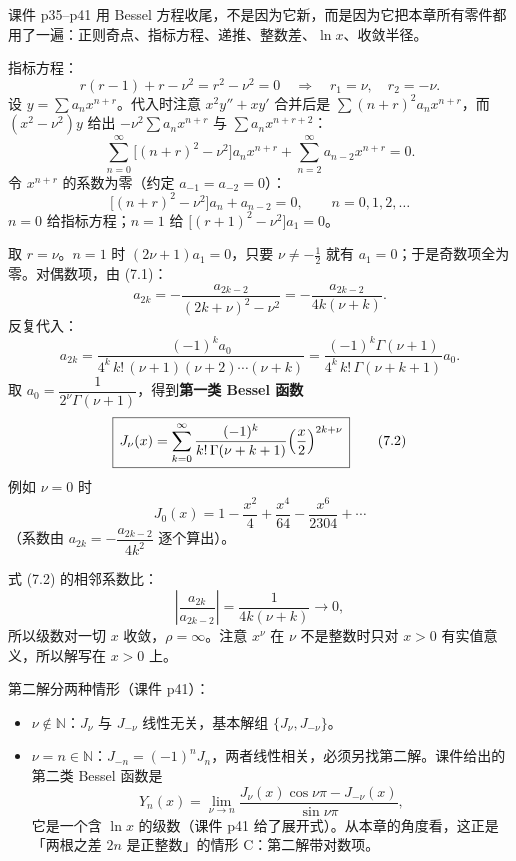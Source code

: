 \documentclass[11pt]{ctexart}
\newcommand{\N}{\mathbb{N}}
\begin{document}
课件 p35--p41 用 Bessel 方程收尾，不是因为它新，而是因为它把本章所有零件都用了一遍：正则奇点、指标方程、递推、整数差、$\ln x$、收敛半径。




指标方程：
\[
r(r-1)+r-\nu^2=r^2-\nu^2=0
\quad\Longrightarrow\quad
r_1=\nu,\quad r_2=-\nu .
\]
设 $y=\sum a_nx^{n+r}$。代入时注意 $x^2y''+xy'$ 合并后是 $\sum(n+r)^2a_nx^{n+r}$，而 $(x^2-\nu^2)y$ 给出 $-\nu^2\sum a_nx^{n+r}$ 与 $\sum a_nx^{n+r+2}$：
\[
\sum_{n=0}^{\infty}\bigl[(n+r)^2-\nu^2\bigr]a_nx^{n+r}+\sum_{n=2}^{\infty}a_{n-2}x^{n+r}=0 .
\]
令 $x^{n+r}$ 的系数为零（约定 $a_{-1}=a_{-2}=0$）：
\[
\bigl[(n+r)^2-\nu^2\bigr]a_n+a_{n-2}=0,\qquad n=0,1,2,\dots \tag{7.1}
\]
$n=0$ 给指标方程；$n=1$ 给 $\bigl[(r+1)^2-\nu^2\bigr]a_1=0$。

取 $r=\nu$。$n=1$ 时 $(2\nu+1)a_1=0$，只要 $\nu\neq-\frac12$ 就有 $a_1=0$；于是奇数项全为零。对偶数项，由 (7.1)：
\[
a_{2k}=-\frac{a_{2k-2}}{(2k+\nu)^2-\nu^2}
=-\frac{a_{2k-2}}{4k(\nu+k)} .
\]
反复代入：
\[
a_{2k}=\frac{(-1)^ka_0}{4^k\,k!\,(\nu+1)(\nu+2)\cdots(\nu+k)}
=\frac{(-1)^k\Gamma(\nu+1)}{4^k\,k!\,\Gamma(\nu+k+1)}a_0 .
\]
取 $a_0=\dfrac{1}{2^\nu\Gamma(\nu+1)}$，得到\textbf{第一类 Bessel 函数}
\[
\boxed{\,J_\nu(x)=\sum_{k=0}^{\infty}\frac{(-1)^k}{k!\,\Gamma(\nu+k+1)}\Bigl(\frac{x}{2}\Bigr)^{2k+\nu}\,} \tag{7.2}
\]
例如 $\nu=0$ 时
\[
J_0(x)=1-\frac{x^2}{4}+\frac{x^4}{64}-\frac{x^6}{2304}+\cdots
\]
（系数由 $a_{2k}=-\dfrac{a_{2k-2}}{4k^2}$ 逐个算出）。


式 (7.2) 的相邻系数比：
\[
\left|\frac{a_{2k}}{a_{2k-2}}\right|=\frac{1}{4k(\nu+k)}\to0,
\]
所以级数对一切 $x$ 收敛，$\rho=\infty$。注意 $x^\nu$ 在 $\nu$ 不是整数时只对 $x>0$ 有实值意义，所以解写在 $x>0$ 上。

第二解分两种情形（课件 p41）：
\begin{itemize}
  \item $\nu\notin\N$：$J_\nu$ 与 $J_{-\nu}$ 线性无关，基本解组 $\{J_\nu,J_{-\nu}\}$。
  \item $\nu=n\in\N$：$J_{-n}=(-1)^nJ_n$，两者线性相关，必须另找第二解。课件给出的第二类 Bessel 函数是
  \[
  Y_n(x)=\lim_{\nu\to n}\frac{J_\nu(x)\cos\nu\pi-J_{-\nu}(x)}{\sin\nu\pi},
  \]
  它是一个含 $\ln x$ 的级数（课件 p41 给了展开式）。从本章的角度看，这正是「两根之差 $2n$ 是正整数」的情形 C：第二解带对数项。
\end{itemize}
\end{document}
